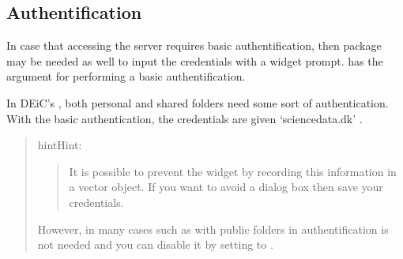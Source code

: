 \documentclass[a4paper,12pt,english]{sphinxhowto}
\begin{document}
\subsection{Authentification}
\label{\detokenize{Sciencedata_dk:authentification}}
In case that accessing the server requires basic authentification,
then package  may be needed as well to input the credentials with a widget prompt.
 has the  argument for performing a basic authentification.

In DEiC’s , both personal and shared folders
need some sort of authentication. With the basic authentication, the credentials are given
 ‘sciencedata.dk’ .
\begin{quote}

\begin{sphinxadmonition}{hint}{Hint:}\begin{quote}

It is possible to prevent the widget by recording this information in a vector object.
If you want to avoid a dialog box then save your credentials.

\begin{sphinxVerbatim}[commandchars=\\\{\},formatcom=\footnotesize]
    
\end{sphinxVerbatim}
\end{quote}

However, in many cases such as with public folders in 
authentification        is not needed and you can disable it by setting  to
.
\end{sphinxadmonition}
\end{quote}
\end{document}
